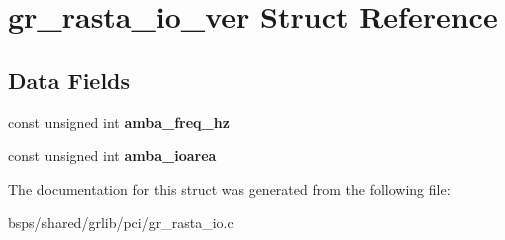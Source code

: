 \hypertarget{structgr__rasta__io__ver}{}\section{gr\+\_\+rasta\+\_\+io\+\_\+ver Struct Reference}
\label{structgr__rasta__io__ver}
\subsection*{Data Fields}
\begin{DoxyCompactItemize}
\item 
\mbox{\label{structgr__rasta__io__ver_ae4f34ab11607064517ca9df1569040c4}} 
const unsigned int {\bfseries amba\+\_\+freq\+\_\+hz}
\item 
\mbox{\label{structgr__rasta__io__ver_af0d72d28b413cd4effd04a7ed2e74e43}} 
const unsigned int {\bfseries amba\+\_\+ioarea}
\end{DoxyCompactItemize}


The documentation for this struct was generated from the following file\+:\begin{DoxyCompactItemize}
\item 
bsps/shared/grlib/pci/gr\+\_\+rasta\+\_\+io.\+c\end{DoxyCompactItemize}
